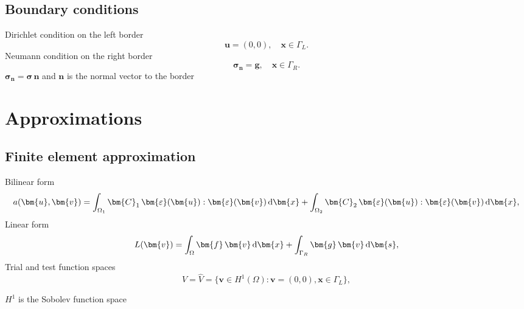 \documentclass[compress,pdf,mathserif]{beamer}
\begin{document}
\subsection{Boundary conditions}
\begin{frame}
    \centering

    Dirichlet condition on the left border
    \[
    \bm{u} = (0, 0), \quad \bm{x} \in \Gamma_L.
    \]
    Neumann condition on the right border
    \[
    \bm{\sigma}_{\bm{n}} = \bm{g}, \quad \bm{x} \in \Gamma_R.
    \]
    $\bm{\sigma}_{\bm{n}}=\bm{\sigma}\,\bm{n}$ and $\bm{n}$ is the normal vector to the border
\end{frame}

\section{Approximations}
\subsection{Finite element approximation}
\begin{frame}
    \centering
    Bilinear form
    \[
        a(\bm{u}, \bm{v}) = \int_{\Omega_1} \bm{C}_1 \, \bm{\varepsilon}(\bm{u}): \bm{\varepsilon}(\bm{v})\, {\rm d}\bm{x} + \int_{\Omega_2} \bm{C}_2 \, \bm{\varepsilon}(\bm{u}) : \bm{\varepsilon}(\bm{v}) \,{\rm d}\bm{x},
    \]
    Linear form
    \[
        L(\bm{v}) = \int_{\Omega}\bm{f}\, \bm{v}\, {\rm d}\bm{x} + \int_{\Gamma_R}\bm{g}\, \bm{v}\, {\rm d}\bm{s},
    \]
    Trial and test function spaces
    \[
        V = \widehat{V} = \{\bm{v} \in H^1(\Omega) : \bm{v} = (0, 0), \bm{x} \in \Gamma_L \},
    \]

    $H^1$ is the Sobolev function space
\end{frame}
\end{document}
